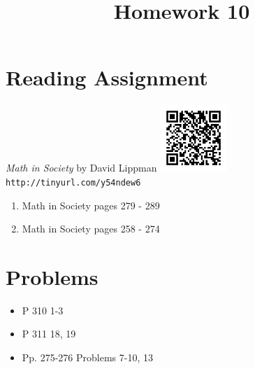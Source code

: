 \documentclass{article}
\title{Homework 10}
\date{}
\begin{document}
\maketitle

\section*{Reading Assignment}
\begin{center}
    {\em Math in Society} by David Lippman\newline
    \includegraphics[width=1in]{readings/society}\newline
    {\tt http://tinyurl.com/y54ndew6}
\end{center}
\begin{enumerate}
\item Math in Society pages 279 - 289
\item Math in Society pages 258 - 274
\end{enumerate}

\section*{Problems}
\begin{itemize}
    \item P 310 1-3
    \item P 311 18, 19
    \item Pp. 275-276 Problems 7-10, 13
\end{itemize}
\end{document}
